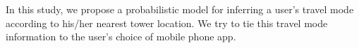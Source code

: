 In this study, we propose a probabilistic model for inferring a user's travel mode according to his/her nearest tower location. 
We try to tie this travel mode information to the user's choice of mobile phone app. 

